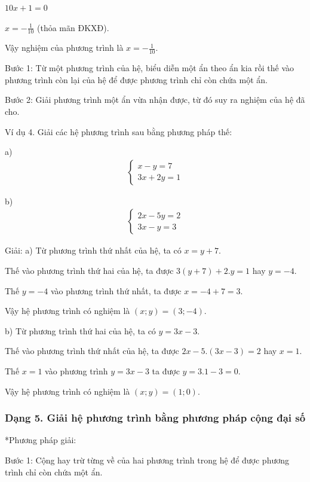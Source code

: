 \documentclass[%
    fontsize=12pt,%
    chapterprefix=false,%
    open=right,%
    twoside=false,%
    numbers=noenddot,%
    headings=optiontohead,%
    final,%
    DIV=15,%
    parskip=half %
]{scrbook}
\begin{document}
$10x + 1 = 0$

$x = -\frac{1}{10}$ (thỏa mãn ĐKXĐ).

Vậy nghiệm của phương trình là $x = -\frac{1}{10}$.


Bước 1: Từ một phương trình của hệ, biểu diễn một ẩn theo ẩn kia rồi thế vào phương trình còn lại của hệ để được phương trình chỉ còn chứa một ẩn.

Bước 2: Giải phương trình một ẩn vừa nhận được, từ đó suy ra nghiệm của hệ đã cho.

Ví dụ 4. Giải các hệ phương trình sau bằng phương pháp thế:

a) \begin{align*} \begin{cases} x - y = 7 \\ 3x + 2y = 1 \end{cases} \end{align*}

b) \begin{align*} \begin{cases} 2x - 5y = 2 \\ 3x - y = 3 \end{cases} \end{align*}

Giải: a) Từ phương trình thứ nhất của hệ, ta có $ x = y + 7 $.

Thế vào phương trình thứ hai của hệ, ta được $ 3(y + 7) + 2.y = 1 $ hay $ y = -4 $.

Thế $ y = -4 $ vào phương trình thứ nhất, ta được $ x = -4 + 7 = 3 $.

Vậy hệ phương trình có nghiệm là $ (x; y) = (3; -4) $.

b) Từ phương trình thứ hai của hệ, ta có $ y = 3x - 3 $.

Thế vào phương trình thứ nhất của hệ, ta được $ 2x - 5.(3x - 3) = 2 $ hay $ x = 1 $.

Thế $ x = 1 $ vào phương trình $ y = 3x - 3 $ ta được $ y = 3.1 - 3 = 0 $.

Vậy hệ phương trình có nghiệm là $ (x; y) = (1; 0) $.
\subsubsection{Dạng 5. Giải hệ phương trình bằng phương pháp cộng đại số}

*Phương pháp giải:

Bước 1: Cộng hay trừ từng về của hai phương trình trong hệ để được phương trình chỉ còn chứa một ẩn.
\end{document}

